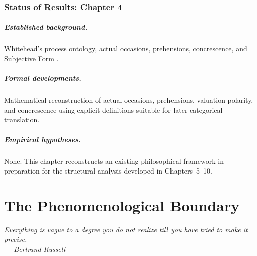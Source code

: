 \documentclass[11pt,twoside,openright]{book}
\numberwithin{equation}{chapter}
\theoremstyle{definition}
\theoremstyle{plain}
\theoremstyle{remark}
\theoremstyle{definition}
\begin{document}
\subsection*{Status of Results: Chapter 4}

\paragraph{Established background.} Whitehead's process ontology, actual
occasions, prehensions, concrescence, and Subjective Form
\cite{Whitehead1929}.

\paragraph{Formal developments.} Mathematical reconstruction of actual
occasions, prehensions, valuation polarity, and concrescence using
explicit definitions suitable for later categorical translation.

\paragraph{Empirical hypotheses.} None. This chapter reconstructs an
existing philosophical framework in preparation for the structural
analysis developed in Chapters~5--10.

\chapter{The Phenomenological Boundary}
\label{ch:phenomenological-boundary}

\vspace{1em}
\begin{flushright}\itshape
Everything is vague to a degree you do not realize till you have tried to
make it precise.\\
\upshape --- Bertrand Russell
\end{flushright}
\vspace{1em}
\end{document}
